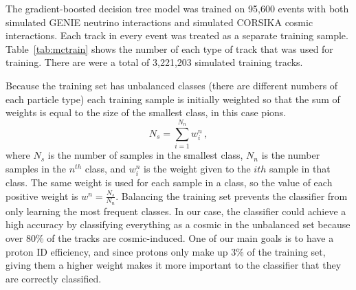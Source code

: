     The gradient-boosted decision tree model was trained on 95,600 events with
    both simulated GENIE neutrino interactions and simulated CORSIKA cosmic
    interactions. Each track in every event was treated as a separate training
    sample. Table~\ref{tab:mctrain} shows the number of each type of track that
    was used for training. There are were a total of 3,221,203 simulated
    training tracks.

    Because the training set has unbalanced classes (there are different
    numbers of each particle type) each training sample is initially weighted
    so that the sum of weights is equal to the size of the smallest class, in
    this case pions.
    \begin{equation*}
      N_s = \sum_{i=1}^{N_{n}}w^n_i \,,
    \end{equation*}
    where $N_s$ is the number of samples in the smallest class, $N_{n}$ is the
    number samples in the $n^{th}$ class, and $w^n_i$ is the weight given to
    the $ith$ sample in that class. The same weight is used for each sample in
    a class, so the value of each positive weight is $w^n=\frac{N_s}{N_{n}}$.
    Balancing the training set prevents the classifier from only learning the
    most frequent classes. In our case, the classifier could achieve a high
    accuracy by classifying everything as a cosmic in the unbalanced set
    because over 80\% of the tracks are cosmic-induced. One of our main goals
    is to have a proton ID efficiency, and since protons only make up 3\% of
    the training set, giving them a higher weight makes it more important to
    the classifier that they are correctly classified.


